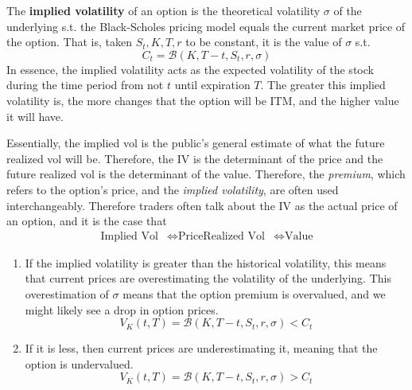 \documentclass{article}
\begin{document}
    \begin{definition}
      The \textbf{implied volatility} of an option is the theoretical volatility $\sigma$ of the underlying s.t. the Black-Scholes pricing model equals the current market price of the option. That is, taken $S_t, K, T, r$ to be constant, it is the value of $\sigma$ s.t. 
      \begin{equation}
        C_t = \mathcal{B}(K, T - t, S_t, r, \sigma)
      \end{equation}
      In essence, the implied volatility acts as the expected volatility of the stock during the time period from not $t$ until expiration $T$. The greater this implied volatility is, the more changes that the option will be ITM, and the higher value it will have. 
    \end{definition}

    Essentially, the implied vol is the public's general estimate of what the future realized vol will be. Therefore, the IV is the determinant of the price and the future realized vol is the determinant of the value. Therefore, the \textit{premium}, which refers to the option's price, and the \textit{implied volatility}, are often used interchangeably. Therefore traders often talk about the IV as the actual price of an option, and it is the case that 
    \begin{align*}
      \text{Implied Vol} & \iff  \text{Price}
      \text{Realized Vol} & \iff \text{Value}
    \end{align*}

    \begin{enumerate}
      \item If the implied volatility is greater than the historical volatility, this means that current prices are overestimating the volatility of the underlying. This overestimation of $\sigma$ means that the option premium is overvalued, and we might likely see a drop in option prices. 
      \begin{equation}
        V_K (t, T) = \mathcal{B} (K, T - t, S_t, r, \sigma) < C_t
      \end{equation}

      \item If it is less, then current prices are underestimating it, meaning that the option is undervalued. 
      \begin{equation}
        V_K (t, T) = \mathcal{B} (K, T - t, S_t, r, \sigma) > C_t
      \end{equation}
    \end{enumerate}
\end{document}
